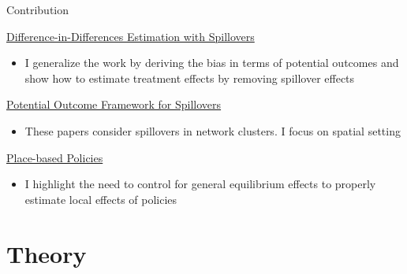 \documentclass[aspectratio=169]{beamer}
\begin{document}
\begin{frame}{Contribution}

    {\footnotesize
    
    \underline{Difference-in-Differences Estimation with Spillovers} 
    
    \begin{citecolor}
    \end{citecolor}
    
    \begin{itemize}
        \item I generalize the work by deriving the bias in terms of potential outcomes and show how to estimate treatment effects by removing spillover effects
    \end{itemize}


    \pause
    \underline{Potential Outcome Framework for Spillovers}
    
    \begin{citecolor}
    \end{citecolor}

    \begin{itemize}
        \item These papers consider spillovers in network clusters. I focus on spatial setting
    \end{itemize}


    \pause
    \underline{Place-based Policies}

    \begin{citecolor}
    \end{citecolor}

    \begin{itemize}
        \item I highlight the need to control for general equilibrium effects to properly estimate local effects of policies
    \end{itemize}
    }
\end{frame}


\section{Theory}
\end{document}
